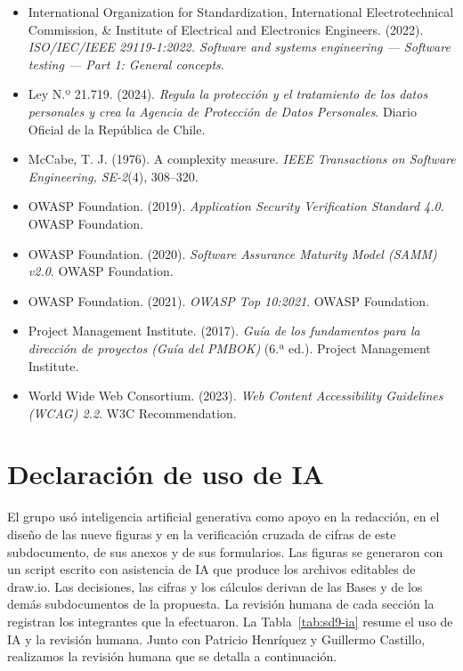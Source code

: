 \begin{itemize}[before=\raggedright,itemsep=0pt,parsep=0pt,topsep=2pt]
  \item International Organization for Standardization, International Electrotechnical Commission, \& Institute of Electrical and Electronics Engineers. (2022). \emph{ISO/IEC/IEEE 29119-1:2022. Software and systems engineering — Software testing — Part 1: General concepts}.
  \item Ley N.º 21.719. (2024). \emph{Regula la protección y el tratamiento de los datos personales y crea la Agencia de Protección de Datos Personales}. Diario Oficial de la República de Chile.
  \item McCabe, T. J. (1976). A complexity measure. \emph{IEEE Transactions on Software Engineering, SE-2}(4), 308–320.
  \item OWASP Foundation. (2019). \emph{Application Security Verification Standard 4.0}. OWASP Foundation.
  \item OWASP Foundation. (2020). \emph{Software Assurance Maturity Model (SAMM) v2.0}. OWASP Foundation.
  \item OWASP Foundation. (2021). \emph{OWASP Top 10:2021}. OWASP Foundation.
  \item Project Management Institute. (2017). \emph{Guía de los fundamentos para la dirección de proyectos (Guía del PMBOK)} (6.ª ed.). Project Management Institute.
  \item World Wide Web Consortium. (2023). \emph{Web Content Accessibility Guidelines (WCAG) 2.2}. W3C Recommendation.
\end{itemize}

\section*{Declaración de uso de IA}

El grupo usó inteligencia artificial generativa como apoyo en la redacción, en el diseño de las nueve figuras y en la verificación cruzada de cifras de este subdocumento, de sus anexos y de sus formularios. Las figuras se generaron con un script escrito con asistencia de IA que produce los archivos editables de draw.io. Las decisiones, las cifras y los cálculos derivan de las Bases y de los demás subdocumentos de la propuesta. La revisión humana de cada sección la registran los integrantes que la efectuaron. La Tabla~\ref{tab:sd9-ia} resume el uso de IA y la revisión humana. Junto con Patricio Henríquez y Guillermo Castillo, realizamos la revisión humana que se detalla a continuación.

